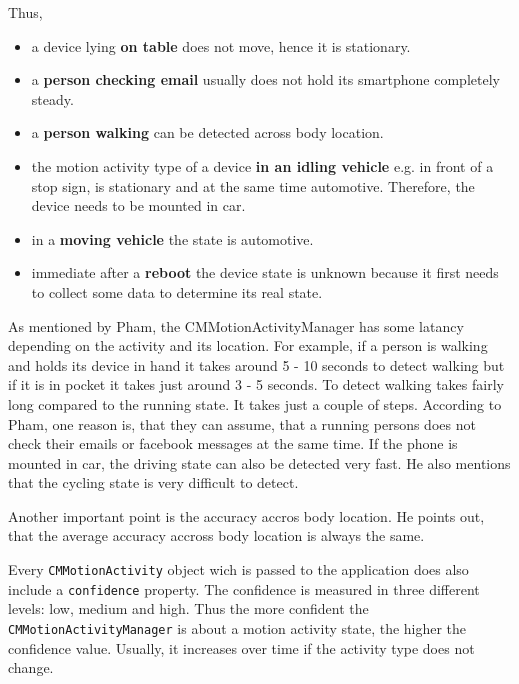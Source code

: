 Thus,
\begin{itemize}
  \item a device lying \textbf{on table} does not move, hence it is stationary.
  \item a \textbf{person checking email}  usually does not hold its smartphone completely steady.
  \item a \textbf{person walking} can be detected across body location.
  \item the motion activity type of a device \textbf{in an idling vehicle} e.g. in front of a stop sign, is stationary and at the same time automotive. Therefore, the device needs to be mounted in car.
  \item in a \textbf{moving vehicle} the state is  automotive.
  \item immediate after a \textbf{reboot} the device state is unknown because it first needs to collect some data to determine its real state.
\end{itemize}

As mentioned by Pham, the CMMotionActivityManager has some latancy depending on the activity and its location.
For example, if a person is walking and holds its device in hand it takes around 5 - 10 seconds to detect walking but if it is in pocket it takes just around 3 - 5 seconds.
To detect walking takes fairly long compared to the running state.
It takes just a couple of steps. According to Pham, one reason is, that they can assume, that a running persons does not check their emails or facebook messages at the same time.
If the phone is mounted in car, the driving state can also be detected very fast. He also mentions that the cycling state is very difficult to detect.

Another important point is the accuracy accros body location.
He points out, that the average accuracy accross body location is always the same.

Every \texttt{CMMotionActivity} object wich is passed to the application does also include a \texttt{confidence} property.
The confidence is measured in three different levels: low, medium and high.
Thus the more confident the \texttt{CMMotionActivityManager} is about a motion activity state, the higher the confidence value.
Usually, it increases over time if the activity type does not change.


